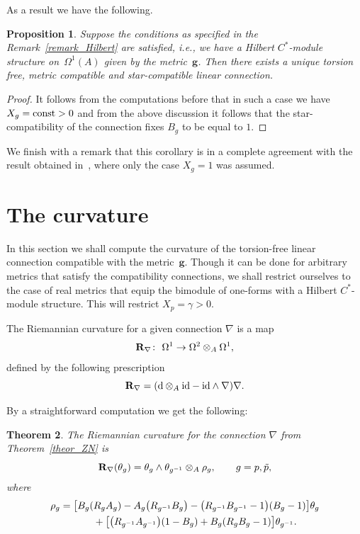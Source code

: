 \documentclass[pdftex]{sigma}
\numberwithin{equation}{section}
\newtheorem{Theorem}{Theorem}[section]
\newtheorem{Proposition}[Theorem]{Proposition}
 { \theoremstyle{definition}
\newtheorem{Definition}[Theorem]{Definition}
\newtheorem{Example}[Theorem]{Example}
\newtheorem{Remark}[Theorem]{Remark} }
\begin{document}
As a result we have the following.
\begin{Proposition} Suppose the conditions as specified in the Remark~{\rm \ref{remark_Hilbert}} are satisfied, i.e., we have a Hilbert $C^\ast$-module structure on~$\Omega^1(A)$ given by the metric~$\mathbf{g}$. Then there exists a unique torsion free, metric compatible and star-compatible linear
connection.
\end{Proposition}
\begin{proof}
It follows from the computations before that in such a case we have $X_g={\rm const}>0$ and from the above discussion it follows that the star-compatibility of the connection fixes $B_g$ to be equal to $1$.
\end{proof}

We finish with a remark that this corollary is in a complete agreement with the result obtained in~\cite{majid2020}, where only the case $X_g=1$ was
assumed.

\section{The curvature}
In this section we shall compute the curvature of the torsion-free linear connection compatible
with the metric~$\mathbf{g}$. Though it can be done for arbitrary metrics that satisfy the
compatibility connections, we shall restrict ourselves to the case of real metrics that equip
the bimodule of one-forms with a Hilbert $C^\ast$-module structure. This will restrict
$X_p=\gamma>0$.

\begin{Definition}
The Riemannian curvature for a given connection $\nabla$ is a map
\begin{equation*}
{\bf R}_\nabla\colon \ \Omega^1 \rightarrow \Omega^2 \otimes_A \Omega^1,
\end{equation*}
defined by the following prescription
\begin{equation*}
{\bf R}_\nabla= ({\rm d}\otimes_A\mathrm{id} -\mathrm{id}\wedge \nabla )\nabla.
\end{equation*}
\end{Definition}
By a straightforward computation we get the following:
\begin{Theorem}
The Riemannian curvature for the connection $\nabla$ from Theorem~{\rm \ref{theor_ZN}} is
\begin{equation*}
{\bf R}_\nabla(\theta_g)=\theta_g\wedge\theta_{g^{-1}}\otimes_A \rho_g, \qquad g=p,\tilde{p},
\end{equation*}
where
\begin{gather*}
\rho_g= \big[B_g(R_gA_g)-A_g\big(R_{g^{-1}}B_g\big)-\big(R_{g^{-1}}B_{g^{-1}}-1\big)(B_g-1)\big]\theta_g\\
\hphantom{\rho_g=}{} + \big[\big(R_{g^{-1}}A_{g^{-1}}\big)(1-B_g)+B_g(R_gB_g-1)\big]\theta_{g^{-1}}.
\end{gather*}
\end{Theorem}
\end{document}
